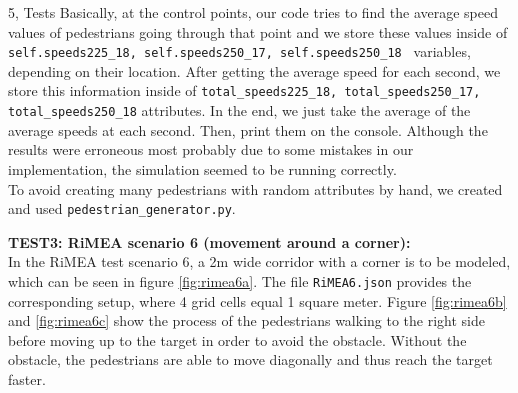 \documentclass[10pt,a4paper]{article}
\begin{document}
\begin{task}{5, Tests}
Basically, at the control points, our code tries to find the average speed values of pedestrians going through that point and we store these values inside of \texttt{self.speeds225\_18, self.speeds250\_17, self.speeds250\_18 } variables, depending on their location. After getting the average speed for each second, we store this information inside of \texttt{total\_speeds225\_18, total\_speeds250\_17, total\_speeds250\_18} attributes. In the end, we just take the average of the average speeds at each second. Then, print them on the console. Although the results were erroneous most probably due to some mistakes in our implementation, the simulation seemed to be running correctly.\\

To avoid creating many pedestrians with random attributes by hand, we created and used \texttt{pedestrian\_generator.py}. 



\textbf{TEST3: RiMEA scenario 6 (movement around a corner):}\\
In the RiMEA test scenario 6, a 2m wide corridor with a corner is to be modeled, which can be seen in figure \ref{fig:rimea6a}. The file \verb|RiMEA6.json| provides the corresponding setup, where 4 grid cells equal 1 square meter. Figure \ref{fig:rimea6b} and \ref{fig:rimea6c} show the process of the pedestrians walking to the right side before moving up to the target in order to avoid the obstacle. Without the obstacle, the pedestrians are able to move diagonally and thus reach the target faster. 


\end{task}
\end{document}
